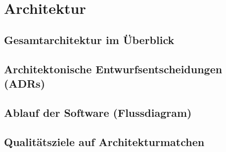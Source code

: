 \chapter{Architektur}

\section{Gesamtarchitektur im Überblick}

\section{Architektonische Entwurfsentscheidungen (ADRs)}

\section{Ablauf der Software (Flussdiagram)}

\section{Qualitätsziele auf Architekturmatchen}
